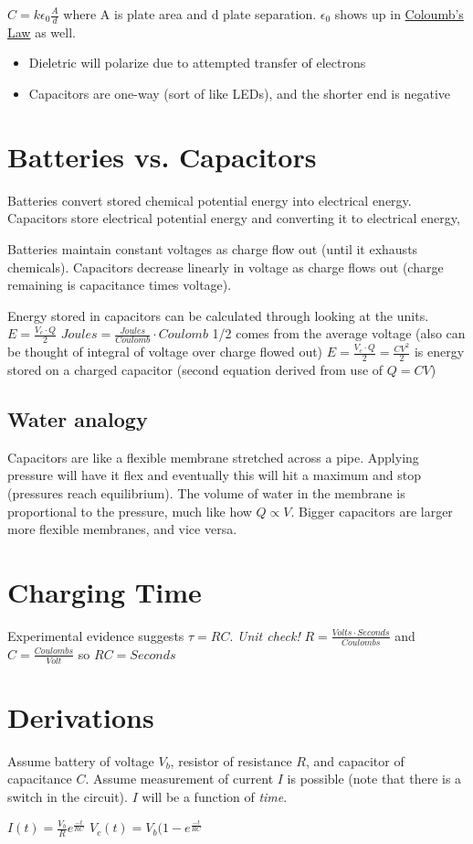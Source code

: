 \documentclass[letterpaper]{article}
\begin{document}
\(C = k\epsilon_0 \frac{A}{d}\) where A is plate area and d plate separation.
\(\epsilon_0\) shows up in \href{phys250-electricalforce.org}{Coloumb's Law} as well.

\begin{itemize}
\item Dieletric will polarize due to attempted transfer of electrons
\item Capacitors are one-way (sort of like LEDs), and the shorter end is negative
\end{itemize}

\section{Batteries vs. Capacitors}
\label{sec:org5d53a64}
Batteries convert stored chemical potential energy into electrical energy.
Capacitors store electrical potential energy and converting it to electrical energy,

Batteries maintain constant voltages as charge flow out (until it exhausts chemicals).
Capacitors decrease linearly in voltage as charge flows out (charge remaining is capacitance times voltage).

Energy stored in capacitors can be calculated through looking at the units.
\(E = \frac{V_c \cdot Q}{2}\)
\(Joules = \frac{Joules}{Coulomb} \cdot Coulomb\)
1/2 comes from the average voltage (also can be thought of integral of voltage over charge flowed out)
\(E = \frac{V_c \cdot Q}{2} = \frac{CV^2}{2}\) is energy stored on a charged capacitor (second equation derived from use of \(Q = CV\))

\subsection{Water analogy}
\label{sec:org6d95d71}
Capacitors are like a flexible membrane stretched across a pipe. Applying pressure will have it flex and eventually this will hit a maximum and stop (pressures reach equilibrium). The volume of water in the membrane is proportional to the pressure, much like how \(Q \propto V\). Bigger capacitors are larger more flexible membranes, and vice versa.

\section{Charging Time}
\label{sec:org43b0804}
Experimental evidence suggests \(\tau = RC\). 
\emph{Unit check!} \(R = \frac{Volts \cdot Seconds}{Coulombs}\) and \(C = \frac{Coulombs}{Volt}\) so \(RC = Seconds\)

\section{Derivations}
\label{sec:org78c43c5}
Assume battery of voltage \(V_b\), resistor of resistance \(R\), and capacitor of capacitance \(C\). Assume measurement of current \(I\) is possible (note that there is a switch in the circuit). \(I\) will be a function of \emph{time}.

\(I(t) = \frac{V_b}{R} e^{\frac{-t}{RC}}\)
\(V_c(t) = V_b (1 - e^{\frac{-t}{RC}}\)
\end{document}
